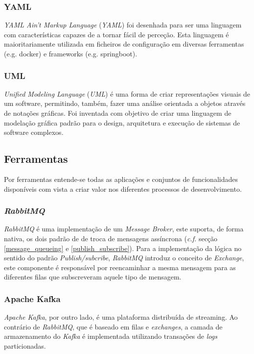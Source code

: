 \subsubsection{YAML}
\emph{YAML Ain't Markup Language} (\emph{YAML\label{sym:YAML}}) foi desenhada para ser uma linguagem com características capazes de a tornar fácil de perceção. Esta linguagem é maioritariamente utilizada em ficheiros de configuração em diversas ferramentas (e.g. docker) e frameworks (e.g. springboot)\cite{yaml}.

\subsubsection{UML}

\emph{Unified Modeling Language} (\emph{UML}\label{sym:UML}) é uma forma de criar representações visuais de um software, permitindo, também, fazer uma análise orientada a objetos através de notações gráficas. Foi inventada com objetivo de criar uma linguagem de modelação gráfica padrão para o design, arquitetura e execução de sistemas de software complexos\cite{uml}.

\subsection{Ferramentas}
Por ferramentas entende-se todas as aplicações e conjuntos de funcionalidades disponíveis com vista a criar valor nos diferentes processos de desenvolvimento\cite{software_tools}.

\subsubsection{\emph{RabbitMQ}}
\emph{RabbitMQ} é uma implementação de um \emph{Message Broker}, este suporta, de forma nativa, os dois padrão de de troca de mensagens assíncrona (\emph{c.f.} secção \ref{message_queueing} e \ref{publish_subscribe}). Para a implementação da lógica no sentido do padrão \emph{Publish/subcribe}, \emph{RabbitMQ} introduz o conceito de \emph{Exchange}, este componente é responsável por reencaminhar a mesma mensagem para as diferentes filas que subscreveram aquele tipo de mensagem.

\subsubsection{Apache Kafka}
\emph{Apache Kafka}, por outro lado, é uma plataforma distribuída de streaming. Ao contrário de \emph{RabbitMQ}, que é baseado em filas e \emph{exchanges}, a camada de armazenamento do \emph{Kafka} é implementada utilizando transações de \emph{logs} particionadas.

